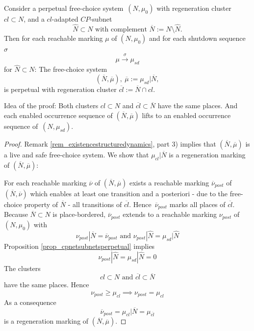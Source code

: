 \documentclass{fundam}
\newcommand{\qed}{}
\begin{document}
\begin{proposition}\label{prop_propagatingperpetuality}
Consider a perpetual free-choice \mbox{system $(N,\mu_0)$} with regeneration \mbox{cluster $cl \subset N$}, and a $cl$-adapted $CP$-subnet
$$\hat{N} \subset N \text{ with complement } \overline{N}:=N \setminus \hat{N}.$$
Then for each reachable marking $\mu$ of $(N,\mu_0)$ and for each shutdown \mbox{sequence $\sigma$}
$$\mu \xrightarrow{\sigma} \mu_{sd}$$
for $\hat{N} \subset N$: The free-choice system
$$(\overline{N},\overline{\mu}),\ \overline{\mu}:=\mu_{sd}|\overline{N},$$
is perpetual with regeneration cluster $\overline{cl}:=\overline{N} \cap cl$.
\end{proposition}
\noindent Idea of the proof: Both clusters $cl\subset N$ and $\overline{cl} \subset \overline{N}$ have the same places. And each enabled occurrence sequence of
$(\overline{N},\overline{\mu})$ lifts to an enabled occurrence sequence \mbox{of $(N,\mu_{sd})$}.
\begin{proof}
Remark \ref{rem_existencestructuredynamics}, part 3) implies that $(\overline{N},\overline{\mu})$ is a live and safe free-choice system. We show that
$\mu_{cl}|\overline{N}$ is a regeneration marking of $(\overline{N},\overline{\mu})$:

\medskip\noindent For each reachable marking $\overline{\nu}$ of $(\overline{N},\overline{\mu})$ exists a reachable marking $\overline{\nu}_{post}$ of $(\overline{N},\overline{\nu})$ which enables at least one transition and a posteriori - due to the free-choice property of $\overline{N}$ - all transitions of $\overline{cl}$. \mbox{Hence $\overline{\nu}_{post}$} marks all places of $\overline{cl}$. Because $\overline{N} \subset N$ is place-bordered, $\overline{\nu}_{post}$ extends to a reachable marking $\nu_{post}$ of $(N,\mu_0)$ with
$$\nu_{post}|\overline{N}=\overline{\nu}_{post} \text{ and } \nu_{post}|\hat{N}=\mu_{sd}|\hat{N}$$
Proposition \ref{prop_cpnetsubnetsperpetual} implies
$$\nu_{post}|\hat{N}=\mu_{sd}|\hat{N}=0$$
The clusters
$$cl \subset N \text{ and } \overline{cl} \subset \overline{N}$$
have the same places. Hence
$$\nu_{post} \geq \mu_{cl} \implies \nu_{post}=\mu_{cl}$$
As a consequence $$\overline{\nu}_{post}=\mu_{cl}|\overline{N}=\mu_{\overline{cl}}$$
is a regeneration marking of $(\overline{N},\overline{\mu})$.\qed
\end{proof}
\end{document}
